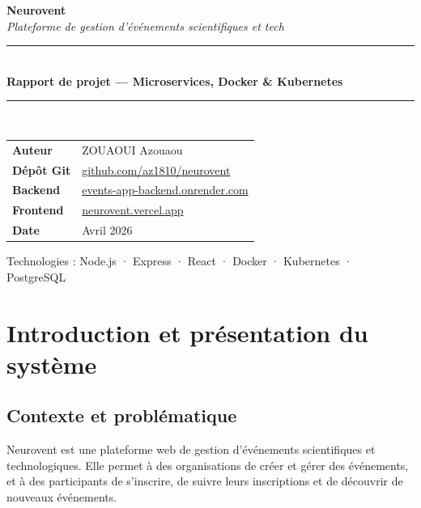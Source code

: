\documentclass[12pt,a4paper]{article}
\begin{document}
\begin{titlepage}
  \centering
  \vspace*{2cm}

  {\Huge\bfseries Neurovent}\\[0.5cm]
  {\Large\itshape Plateforme de gestion d'événements scientifiques et tech}\\[2cm]

  \rule{\linewidth}{0.5pt}\\[0.4cm]
  {\large\bfseries Rapport de projet — Microservices, Docker \& Kubernetes}\\[0.4cm]
  \rule{\linewidth}{0.5pt}\\[2cm]

  \begin{tabular}{ll}
    \textbf{Auteur}       & ZOUAOUI Azouaou \\[0.3cm]
    \textbf{Dépôt Git}    & \href{https://github.com/az1810/neurovent}{github.com/az1810/neurovent} \\[0.3cm]
    \textbf{Backend}      & \href{https://events-app-backend.onrender.com}{events-app-backend.onrender.com} \\[0.3cm]
    \textbf{Frontend}     & \href{https://neurovent.vercel.app}{neurovent.vercel.app} \\[0.3cm]
    \textbf{Date}         & Avril 2026 \\
  \end{tabular}

  \vfill
  {\large Technologies : Node.js · Express · React · Docker · Kubernetes · PostgreSQL}
\end{titlepage}

\tableofcontents
\newpage

\section{Introduction et présentation du système}

\subsection{Contexte et problématique}

Neurovent est une plateforme web de gestion d'événements scientifiques et technologiques.
Elle permet à des organisations de créer et gérer des événements, et à des participants de
s'inscrire, de suivre leurs inscriptions et de découvrir de nouveaux événements.
\end{document}
